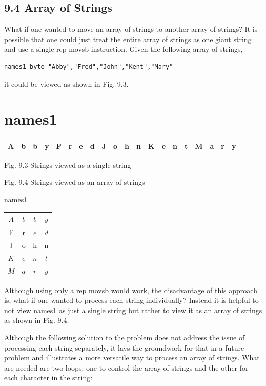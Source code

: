 \documentclass[10pt]{book}
\begin{document}
\subsection*{9.4 Array of Strings}
What if one wanted to move an array of strings to another array of strings? It is possible that one could just treat the entire array of strings as one giant string and use a single rep movsb instruction. Given the following array of strings,

\begin{verbatim}
names1 byte "Abby","Fred","John","Kent","Mary"
\end{verbatim}

it could be viewed as shown in Fig. 9.3.

\section*{names1}
\begin{center}
\begin{tabular}{|l|l|l|l|l|l|l|l|l|l|l|l|l|l|l|l|l|l|l|l|}
\hline
A & b & b & y & F & r & e & d & J & o & h & n & K & e & n & t & M & a & r & y \\
\hline
\end{tabular}
\end{center}

Fig. 9.3 Strings viewed as a single string


Fig. 9.4 Strings viewed as an array of strings

names1 \begin{tabular}{|c|c|c|c|}
\hline
$A$ & $b$ & $b$ & $y$ \\
\hline
F & r & $e$ & $d$ \\
\hline
J & o & h & n \\
\hline
$K$ & $e$ & $n$ & $t$ \\
\hline
$M$ & $a$ & $r$ & $y$ \\
\hline
\end{tabular}

Although using only a rep movsb would work, the disadvantage of this approach is, what if one wanted to process each string individually? Instead it is helpful to not view names1 as just a single string but rather to view it as an array of strings as shown in Fig. 9.4.

Although the following solution to the problem does not address the issue of processing each string separately, it lays the groundwork for that in a future problem and illustrates a more versatile way to process an array of strings. What are needed are two loops: one to control the array of strings and the other for each character in the string:
\end{document}
